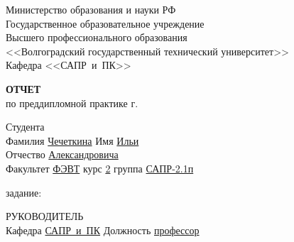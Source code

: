 \documentclass[a4paper, 14pt]{extreport}
\begin{document}
    \begin{titlepage}
        \begin{center}
            Министерство образования и науки РФ \\
            Государственное образовательное учреждение\\
            Высшего профессионального образования\\
            <<Волгоградский государственный технический университет>>\\
            Кафедра <<САПР~и~ПК>>
        \end{center}
        \vspace{2.0cm}
        \begin{center}
            \large \textbf{ОТЧЕТ} \\
            по преддипломной практике \the\year г.
        \end{center}
        \begin{flushleft}
            Студента\\
            Фамилия \underline{Чечеткина\hspace{2.825cm}} 
            Имя \underline{Ильи\hspace{2.7cm}}\\
            Отчество \underline{Александровича\hspace{1.5cm}}\\
            Факультет \underline{ФЭВТ\hspace{3.45cm}} курс \underline{2\hspace{1.5cm}} 
            группа \underline{САПР-2.1п\hspace{1.9cm}}\\
        \end{flushleft}
        \vspace{1.0cm}
         задание: \underline{\hspace{22.3em}}\\
        \underline{\hspace{\textwidth}}
        \underline{\hspace{\textwidth}}
        \underline{\hspace{\textwidth}}
        \underline{\hspace{\textwidth}}
        \vspace{2.0cm}
        \begin{flushleft}
            РУКОВОДИТЕЛЬ\\
            Кафедра \underline{САПР~и~ПК\hspace{2.4cm}} Должность \underline{профессор\hspace{2.8cm}} \\

\end{flushleft}
\end{titlepage}
\end{document}
